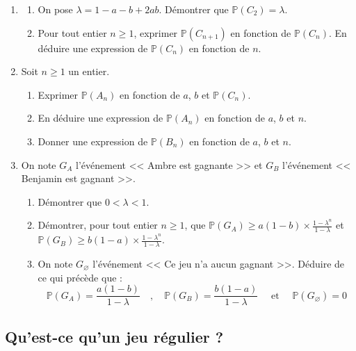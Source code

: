 \documentclass[landscape,twocolumn,leqno,a4paper,10pt]{report} %
\renewcommand{\geq}{\geqslant}
\begin{document}
\begin{enumerate}
	\item \begin{enumerate}
		\item On pose $\lambda=1-a-b+2 a b$. Démontrer que $\mathbb{P}\left(C_{2}\right)=\lambda$.
		\item Pour tout entier $n \geq 1$, exprimer $\mathbb{P}\left(C_{n+1}\right)$ en fonction de $\mathbb{P}\left(C_{n}\right)$. En déduire une expression de $\mathbb{P}\left(C_{n}\right)$ en fonction de $n$.
	\end{enumerate}
	\item Soit $n \geq 1$ un entier.
	\begin{enumerate}
		\item Exprimer $\mathbb{P}\left(A_{n}\right)$ en fonction de $a$, $b$ et $\mathbb{P}\left(C_{n}\right)$.
		\item En déduire une expression de $\mathbb{P}\left(A_{n}\right)$ en fonction de $a$, $b$ et $n$.
		\item Donner une expression de $\mathbb{P}\left(B_{n}\right)$ en fonction de $a$, $b$ et $n$.
	\end{enumerate}
	\item On note $G_{A}$ l'événement << Ambre est gagnante >> et $G_{B}$ l'événement << Benjamin est gagnant >>.
	\begin{enumerate}
		\item Démontrer que $0<\lambda<1$.
		\item Démontrer, pour tout entier $n \geq 1$, que $\mathbb{P}\left(G_{A}\right) \geq a(1-b) \times \frac{1-\lambda^{n}}{1-\lambda}$ et $\mathbb{P}\left(G_{B}\right) \geq b(1-a) \times \frac{1-\lambda^{n}}{1-\lambda}$.
		\item On note $G_{\varnothing}$ l'événement << Ce jeu n'a aucun gagnant >>. Déduire de ce qui précède que :
		$$\mathbb{P}\left(G_{A}\right)=\frac{a(1-b)}{1-\lambda}\quad, \quad \mathbb{P}\left(G_{B}\right)=\frac{b(1-a)}{1-\lambda} \quad\text { et } \quad\mathbb{P}\left(G_{\varnothing}\right)=0$$
	\end{enumerate}
\end{enumerate}


\subsection{Qu'est-ce qu'un jeu régulier ?}
\end{document}
